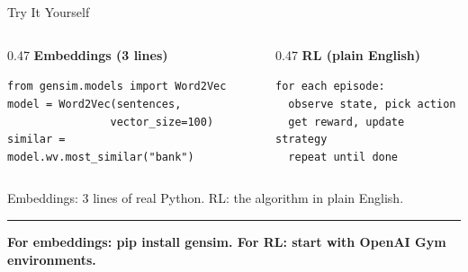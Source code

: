 \documentclass[8pt,aspectratio=169]{beamer}
\newcommand{\bottomnote}[1]{%
\vfill
\vspace{-2mm}
\textcolor{mllavender2}{\rule{\textwidth}{0.4pt}}
\vspace{1mm}
\footnotesize
\textbf{#1}
}
\begin{document}
\begin{frame}{Try It Yourself}
\begin{columns}[T]
\begin{column}{0.47\textwidth}
\textcolor{mlpurple}{\textbf{Embeddings (3 lines)}}

\vspace{2mm}
\footnotesize
\texttt{from gensim.models import Word2Vec}\\[1pt]
\texttt{model = Word2Vec(sentences,}\\
\texttt{~~~~~~~~~~~~~~~~vector\_size=100)}\\[1pt]
\texttt{similar = model.wv.most\_similar("bank")}
\end{column}
\begin{column}{0.47\textwidth}
\textcolor{mlblue}{\textbf{RL (plain English)}}

\vspace{2mm}
\footnotesize
\texttt{for each episode:}\\[1pt]
\texttt{~~observe state, pick action}\\[1pt]
\texttt{~~get reward, update strategy}\\[1pt]
\texttt{~~repeat until done}
\end{column}
\end{columns}
\vspace{4mm}
\small Embeddings: 3 lines of real Python. RL: the algorithm in plain English.
\bottomnote{For embeddings: pip install gensim. For RL: start with OpenAI Gym environments.}
\end{frame}

\end{document}

